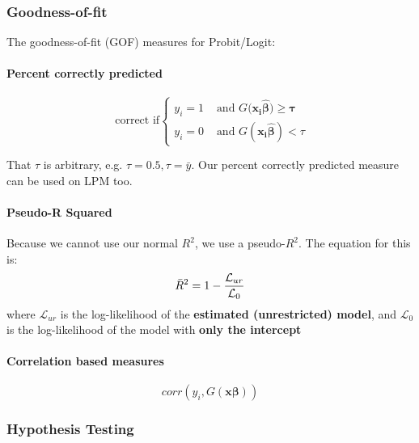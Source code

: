 \documentclass[11pt]{article}
\begin{document}
\subsubsection{Goodness-of-fit}
The goodness-of-fit (GOF) measures for Probit/Logit:
\begin{mdframed}

\paragraph{Percent correctly predicted}\mbox{}

\[\text{ correct if} \begin{cases}
    y_i = 1 &\text{ and  } G(\boldsymbol{x_i \hat{\beta}) \geq \tau} \\
    y_i = 0 &\text{ and } G(\boldsymbol{x_i \hat{\beta}}) < \tau
\end{cases}\]

That $\tau$ is arbitrary, e.g. $\tau = 0.5, \tau = \bar{y}$. Our percent correctly predicted measure can be used on LPM too.
\end{mdframed}

\begin{mdframed}
\paragraph{Pseudo-R Squared} \mbox{}
Because we cannot use our normal $R^2$, we use a pseudo-$R^2$. The equation for this is:
\begin{equation}
    \label{pseudo r squared}
    \Bar{R}^2 = 1 - \dfrac{\mathcal{L}_{ur}}{\mathcal{L}_0}
\end{equation}
where $\mathcal{L}_{ur}$ is the log-likelihood of the \textbf{estimated (unrestricted) model}, and $\mathcal{L}_0$ is the log-likelihood of the model with \textbf{only the intercept}
\end{mdframed}

\begin{mdframed}
    \paragraph{Correlation based measures} \mbox{}
    \[corr(y_i, G(\boldsymbol{x\beta}))\]
\end{mdframed}

\subsubsection{Hypothesis Testing}
\end{document}
